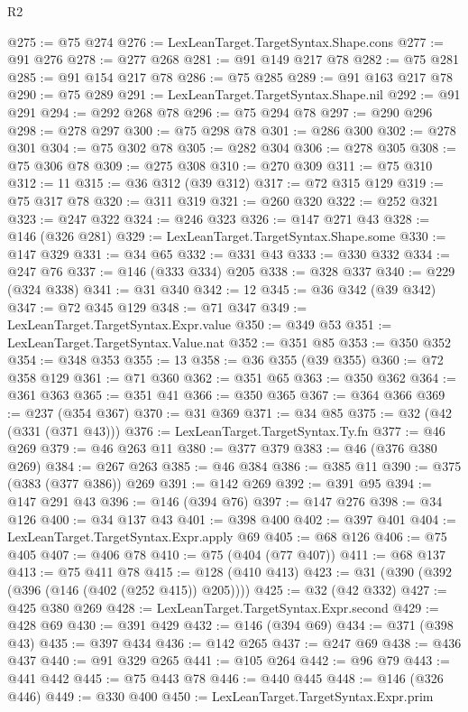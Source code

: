 \begin{lexlean}{R2}
\begin{coremodule}
@275 := @75 @274
@276 := LexLeanTarget.TargetSyntax.Shape.cons
@277 := @91 @276
@278 := @277 @268
@281 := @91 @149 @217 @78
@282 := @75 @281
@285 := @91 @154 @217 @78
@286 := @75 @285
@289 := @91 @163 @217 @78
@290 := @75 @289
@291 := LexLeanTarget.TargetSyntax.Shape.nil
@292 := @91 @291
@294 := @292 @268 @78
@296 := @75 @294 @78
@297 := @290 @296
@298 := @278 @297
@300 := @75 @298 @78
@301 := @286 @300
@302 := @278 @301
@304 := @75 @302 @78
@305 := @282 @304
@306 := @278 @305
@308 := @75 @306 @78
@309 := @275 @308
@310 := @270 @309
@311 := @75 @310
@312 := 11
@315 := @36 @312 (@39 @312)
@317 := @72 @315 @129
@319 := @75 @317 @78
@320 := @311 @319
@321 := @260 @320
@322 := @252 @321
@323 := @247 @322
@324 := @246 @323
@326 := @147 @271 @43
@328 := @146 (@326 @281)
@329 := LexLeanTarget.TargetSyntax.Shape.some
@330 := @147 @329
@331 := @34 @65
@332 := @331 @43
@333 := @330 @332
@334 := @247 @76
@337 := @146 (@333 @334) @205
@338 := @328 @337
@340 := @229 (@324 @338)
@341 := @31 @340
@342 := 12
@345 := @36 @342 (@39 @342)
@347 := @72 @345 @129
@348 := @71 @347
@349 := LexLeanTarget.TargetSyntax.Expr.value
@350 := @349 @53
@351 := LexLeanTarget.TargetSyntax.Value.nat
@352 := @351 @85
@353 := @350 @352
@354 := @348 @353
@355 := 13
@358 := @36 @355 (@39 @355)
@360 := @72 @358 @129
@361 := @71 @360
@362 := @351 @65
@363 := @350 @362
@364 := @361 @363
@365 := @351 @41
@366 := @350 @365
@367 := @364 @366
@369 := @237 (@354 @367)
@370 := @31 @369
@371 := @34 @85
@375 := @32 (@42 (@331 (@371 @43)))
@376 := LexLeanTarget.TargetSyntax.Ty.fn
@377 := @46 @269
@379 := @46 @263 @11
@380 := @377 @379
@383 := @46 (@376 @380 @269)
@384 := @267 @263
@385 := @46 @384
@386 := @385 @11
@390 := @375 (@383 (@377 @386)) @269
@391 := @142 @269
@392 := @391 @95
@394 := @147 @291 @43
@396 := @146 (@394 @76)
@397 := @147 @276
@398 := @34 @126
@400 := @34 @137 @43
@401 := @398 @400
@402 := @397 @401
@404 := LexLeanTarget.TargetSyntax.Expr.apply @69
@405 := @68 @126
@406 := @75 @405
@407 := @406 @78
@410 := @75 (@404 (@77 @407))
@411 := @68 @137
@413 := @75 @411 @78
@415 := @128 (@410 @413)
@423 := @31 (@390 (@392 (@396 (@146 (@402 (@252 @415)) @205))))
@425 := @32 (@42 @332)
@427 := @425 @380 @269
@428 := LexLeanTarget.TargetSyntax.Expr.second
@429 := @428 @69
@430 := @391 @429
@432 := @146 (@394 @69)
@434 := @371 (@398 @43)
@435 := @397 @434
@436 := @142 @265
@437 := @247 @69
@438 := @436 @437
@440 := @91 @329 @265
@441 := @105 @264
@442 := @96 @79
@443 := @441 @442
@445 := @75 @443 @78
@446 := @440 @445
@448 := @146 (@326 @446)
@449 := @330 @400
@450 := LexLeanTarget.TargetSyntax.Expr.prim

\end{coremodule}
\end{lexlean}
